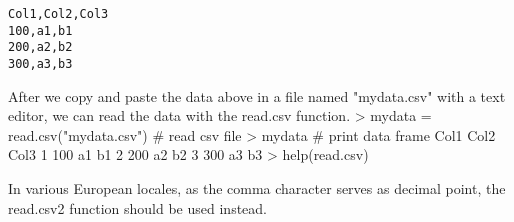 \documentclass{article}
\begin{document}
\begin{verbatim}
Col1,Col2,Col3 
100,a1,b1 
200,a2,b2 
300,a3,b3 
\end{verbatim}

After we copy and paste the data above in a file named "mydata.csv" with a text editor, we can read the data with the read.csv function.
> mydata = read.csv("mydata.csv")  # read csv file 
> mydata                           # print data frame 
  Col1 Col2 Col3 
1  100   a1   b1 
2  200   a2   b2 
3  300   a3   b3 
> help(read.csv)

In various European locales, as the comma character serves as decimal point, the read.csv2 function should be used instead.
\end{document}
